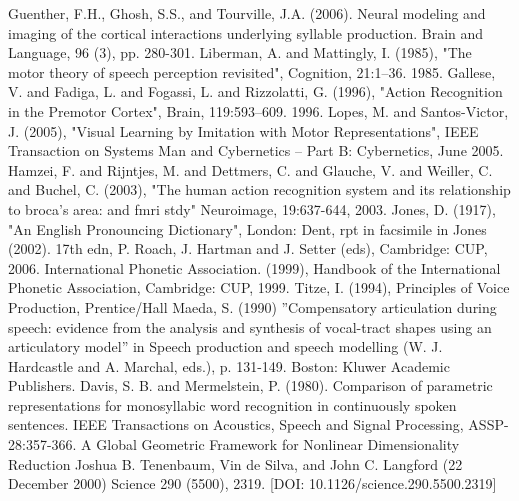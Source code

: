 

\begin{thebibliography}{10}
 Guenther, F.H., Ghosh, S.S., and Tourville, J.A. (2006). Neural modeling and imaging of the cortical interactions underlying syllable production. Brain and Language, 96 (3), pp. 280-301.
 Liberman, A. and Mattingly, I. (1985), "The motor theory of speech perception revisited", Cognition, 21:1--36. 1985.
 Gallese, V. and Fadiga, L. and Fogassi, L. and Rizzolatti, G. (1996), "Action Recognition in the Premotor Cortex", Brain, 119:593--609. 1996.
 Lopes, M. and Santos-Victor, J. (2005), "Visual Learning by Imitation with Motor Representations", IEEE Transaction on Systems Man and Cybernetics -- Part B: Cybernetics, June 2005.
 Hamzei, F. and Rijntjes, M. and Dettmers, C. and Glauche, V. and Weiller, C. and Buchel, C. (2003), "The human action recognition system and its relationship to broca's area: and fmri stdy"  Neuroimage, 19:637-644, 2003.
 Jones, D. (1917), "An English Pronouncing Dictionary", London: Dent, rpt in facsimile in Jones (2002). 17th edn, P. Roach, J. Hartman and J. Setter (eds), Cambridge: CUP, 2006.
 International Phonetic Association. (1999), Handbook of the International Phonetic Association, Cambridge: CUP, 1999. 
 Titze, I. (1994), Principles of Voice Production, Prentice/Hall
Maeda, S. (1990) ''Compensatory articulation during speech: evidence from the analysis and synthesis of vocal-tract shapes using an articulatory model'' in Speech production and speech 
modelling (W. J. Hardcastle and A. Marchal, eds.), p. 131-149.  Boston: Kluwer Academic 
Publishers.
 Davis, S. B. and Mermelstein, P. (1980). Comparison of parametric representations for monosyllabic word recognition in continuously spoken sentences. IEEE Transactions on Acoustics, Speech and Signal Processing,  ASSP-28:357-366.
 A Global Geometric Framework for Nonlinear Dimensionality Reduction
Joshua B. Tenenbaum, Vin de Silva, and John C. Langford (22 December 2000)
Science 290 (5500), 2319. [DOI: 10.1126/science.290.5500.2319]
\end{thebibliography}

